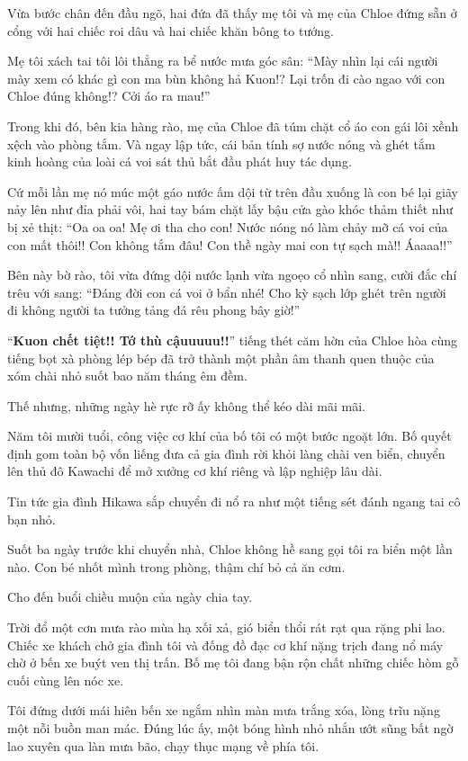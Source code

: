 \documentclass[../main.tex]{subfiles}
\begin{document}
Vừa bước chân đến đầu ngõ, hai đứa đã thấy mẹ tôi và mẹ của Chloe đứng sẵn ở cổng với hai chiếc roi dâu và hai chiếc khăn bông to tướng.

Mẹ tôi xách tai tôi lôi thẳng ra bể nước mưa góc sân: ``Mày nhìn lại cái người mày xem có khác gì con ma bùn không hả Kuon!? Lại trốn đi cào ngao với con Chloe đúng không!? Cởi áo ra mau!''

Trong khi đó, bên kia hàng rào, mẹ của Chloe đã túm chặt cổ áo con gái lôi xềnh xệch vào phòng tắm. Và ngay lập tức, cái bản tính sợ nước nóng và ghét tắm kinh hoàng của loài cá voi sát thủ bắt đầu phát huy tác dụng.

Cứ mỗi lần mẹ nó múc một gáo nước ấm dội từ trên đầu xuống là con bé lại giãy nảy lên như đỉa phải vôi, hai tay bám chặt lấy bậu cửa gào khóc thảm thiết như bị xẻ thịt: ``Oa oa oa! Mẹ ơi tha cho con! Nước nóng nó làm chảy mỡ cá voi của con mất thôi!! Con không tắm đâu! Con thề ngày mai con tự sạch mà!! Áaaaa!!''

Bên này bờ rào, tôi vừa đứng dội nước lạnh vừa ngoẹo cổ nhìn sang, cười đắc chí trêu với sang: ``Đáng đời con cá voi ở bẩn nhé! Cho kỳ sạch lớp ghét trên người đi không người ta tưởng tảng đá rêu phong bây giờ!''

``\textbf{Kuon chết tiệt!! Tớ thù cậuuuuu!!}'' tiếng thét căm hờn của Chloe hòa cùng tiếng bọt xà phòng lép bép đã trở thành một phần âm thanh quen thuộc của xóm chài nhỏ suốt bao năm tháng êm đềm.

Thế nhưng, những ngày hè rực rỡ ấy không thể kéo dài mãi mãi.

Năm tôi mười tuổi, công việc cơ khí của bố tôi có một bước ngoặt lớn. Bố quyết định gom toàn bộ vốn liếng đưa cả gia đình rời khỏi làng chài ven biển, chuyển lên thủ đô Kawachi để mở xưởng cơ khí riêng và lập nghiệp lâu dài.

Tin tức gia đình Hikawa sắp chuyển đi nổ ra như một tiếng sét đánh ngang tai cô bạn nhỏ.

Suốt ba ngày trước khi chuyển nhà, Chloe không hề sang gọi tôi ra biển một lần nào. Con bé nhốt mình trong phòng, thậm chí bỏ cả ăn cơm.

Cho đến buổi chiều muộn của ngày chia tay.

Trời đổ một cơn mưa rào mùa hạ xối xả, gió biển thổi rát rạt qua rặng phi lao. Chiếc xe khách chở gia đình tôi và đống đồ đạc cơ khí nặng trịch đang nổ máy chờ ở bến xe buýt ven thị trấn. Bố mẹ tôi đang bận rộn chất những chiếc hòm gỗ cuối cùng lên nóc xe.

Tôi đứng dưới mái hiên bến xe ngắm nhìn màn mưa trắng xóa, lòng trĩu nặng một nỗi buồn man mác. Đúng lúc ấy, một bóng hình nhỏ nhắn ướt sũng bất ngờ lao xuyên qua làn mưa bão, chạy thục mạng về phía tôi.
\end{document}

